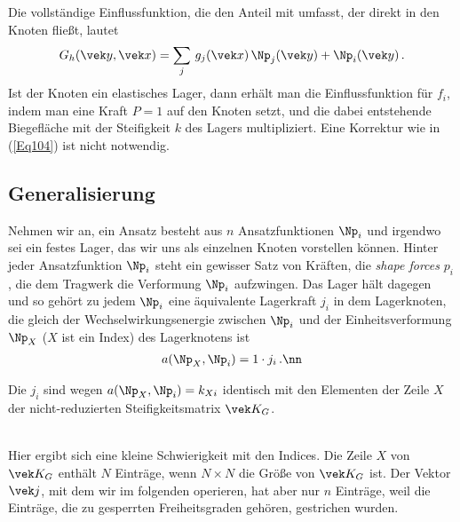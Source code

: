 {{{{{Die vollst\"{a}ndige Einflussfunktion, die den Anteil mit umfasst, der direkt in den Knoten flie{\ss}t, lautet
\begin{align} \label{Eq104}
G_h(\vek y,\vek x) = \sum_j\,g_j(\vek x)\,\Np_j(\vek y) + \Np_i(\vek y)\,.
\end{align}
Ist der Knoten ein elastisches Lager, dann erh\"{a}lt man die Einflussfunktion f\"{u}r $f_i$, indem man eine Kraft $P = 1$ auf den Knoten setzt, und die dabei entstehende Biegefl\"{a}che mit der Steifigkeit $k$ des Lagers multipliziert. Eine Korrektur wie in (\ref{Eq104}) ist nicht notwendig.
\\

{\textcolor{blau2}{\section{Generalisierung}}\label{General}

Nehmen wir an, ein Ansatz besteht aus $n $ Ansatzfunktionen $\Np_i$ und irgendwo sei ein festes Lager, das wir uns als einzelnen Knoten vorstellen k\"{o}nnen. Hinter jeder Ansatzfunktion $\Np_i$ steht ein gewisser Satz von Kr\"{a}ften, die {\em shape forces\/} $p_i$, die dem Tragwerk die Verformung $\Np_i$ aufzwingen. Das Lager  h\"{a}lt dagegen und so geh\"{o}rt zu jedem $\Np_i$ eine \"{a}quivalente Lagerkraft $j_i$  in dem Lagerknoten, die gleich der Wechselwirkungsenergie zwischen $\Np_i$  und der Einheitsverformung $\Np_X$ ($X$ ist ein Index) des Lagerknotens ist
\begin{align}\label{Eq99}
a(\Np_X,\Np_i) = 1 \cdot j_i\,.\nn
\end{align}

\hspace*{-12pt}\colorbox{hellgrau}{\parbox{0.98\textwidth}{Die $j_i$ sind wegen $a(\Np_X,\Np_i) = k_{X i}$ identisch mit den Elementen der Zeile $X$ der nicht-reduzierten Steifigkeitsmatrix $\vek K_{G}$.}}\\

Hier ergibt sich eine kleine Schwierigkeit mit den Indices. Die Zeile $X$ von $\vek K_{G}$ enth\"{a}lt $N$ Eintr\"{a}ge, wenn $N \times N$ die Gr\"{o}{\ss}e von $\vek K_{G}$ ist. Der Vektor $\vek j$, mit dem wir im folgenden operieren, hat aber nur $n$ Eintr\"{a}ge, weil die Eintr\"{a}ge, die zu gesperrten Freiheitsgraden geh\"{o}ren, gestrichen wurden.

}}}}}}
